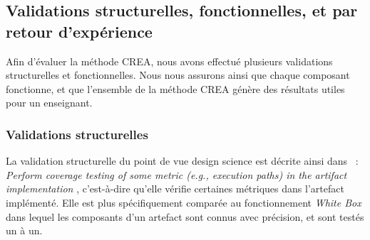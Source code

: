 \subsection{Validations structurelles, fonctionnelles, et par retour d'expérience}
\label{subsection:Evaluation:ProtocoleEvaluation:ValidationsStructurellesFonctionnellesREX}

Afin d'évaluer la méthode CREA, nous avons effectué plusieurs validations structurelles et fonctionnelles.
Nous nous assurons ainsi que chaque composant fonctionne, et que l'ensemble de la méthode CREA génère des résultats utiles pour un enseignant.


\subsubsection{Validations structurelles}
\label{subsubsection:Evaluation:ProtocoleEvaluation:ValidationsStructurellesFonctionnellesREX:Structurelle}

La validation structurelle du point de vue design science est décrite ainsi dans~\cite{hevner2004design} : \og \textit{Perform coverage testing of some metric (e.g., execution paths) in the artifact implementation} \fg , c'est-à-dire qu'elle vérifie certaines métriques dans l'artefact implémenté.
Elle est plus spécifiquement comparée au fonctionnement \og \textit{White Box} \fg dans lequel les composants d'un artefact sont connus avec précision, et sont testés un à un.

\bigskip

